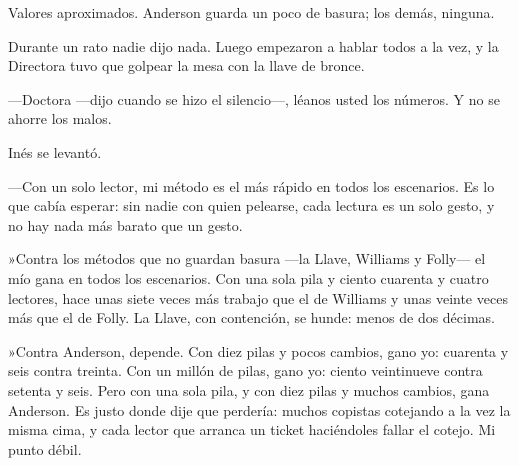 \begin{documento}
\footnotesize
{}

\smallskip
{\scriptsize Valores aproximados. Anderson guarda un poco de basura; los demás, ninguna.}
\end{documento}

Durante un rato nadie dijo nada. Luego empezaron a hablar todos a la vez, y la Directora tuvo que golpear la mesa con la llave de bronce.

---Doctora ---dijo cuando se hizo el silencio---\nobreak, léanos usted los números. Y no se ahorre los malos.

Inés se levantó.

---Con un solo lector, mi método es el más rápido en todos los escenarios. Es lo que cabía esperar: sin nadie con quien pelearse, cada lectura es un solo gesto, y no hay nada más barato que un gesto.

»Contra los métodos que no guardan basura ---la Llave, Williams y Folly--- el mío gana en todos los escenarios. Con una sola pila y ciento cuarenta y cuatro lectores, hace unas siete veces más trabajo que el de Williams y unas veinte veces más que el de Folly. La Llave, con contención, se hunde: menos de dos décimas.

»Contra Anderson, depende. Con diez pilas y pocos cambios, gano yo: cuarenta y seis contra treinta. Con un millón de pilas, gano yo: ciento veintinueve contra setenta y seis. Pero con una sola pila, y con diez pilas y muchos cambios, gana Anderson. Es justo donde dije que perdería: muchos copistas cotejando a la vez la misma cima, y cada lector que arranca un ticket haciéndoles fallar el cotejo. Mi punto débil.

